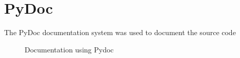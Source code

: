   \section{PyDoc}
    The PyDoc documentation system was used to document the source code
    \begin{figure}[h!]
      \centering
      \caption{Documentation using Pydoc}
      \label{fig:pydoc}
    \end{figure}


